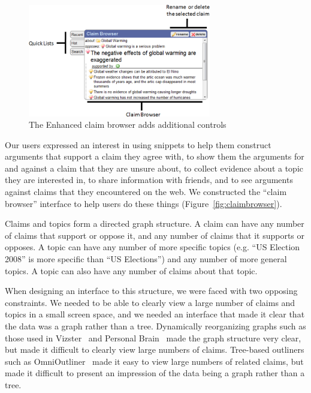 \documentclass{chi2009}
\newcommand{\todo}[1]{}
\begin{document}
\begin{figure}[tb]
	\begin{center}
	\includegraphics[width=8cm]{../screenshots/fullbrowser.png}
	\caption{The Enhanced claim browser adds additional controls}
	\label{enhancedbrowser}
	\end{center}
\end{figure}

Our users expressed an interest in using snippets to help them construct arguments that support a claim they agree with, to show them the arguments for and against a claim that they are unsure about, to collect evidence about a topic they are interested in, to share information with friends, and to see arguments against claims that they encountered on the web. We constructed the ``claim browser'' interface to help users do these things (Figure~\ref{fig:claimbrowser}).

Claims and topics form a directed graph structure. A claim can have any number of claims that support or oppose it, and any number of claims that it supports or opposes.
A topic can have any number of more specific topics (e.g. ``US Election 2008'' is more specific than ``US Elections'') and any number of more general topics. A topic can also have any number of claims about that topic.

When designing an interface to this structure, we were faced with two opposing constraints. We needed to be able to clearly view a large number of claims and topics in a small screen space, and we needed an interface that made it clear that the data was a graph rather than a tree. Dynamically reorganizing graphs such as those used in Vizster~\cite{vizster} and Personal Brain~\cite{thebrain} made the graph structure very clear, but made it difficult to clearly view large numbers of claims. Tree-based outliners such as OmniOutliner~\cite{outliner} made it easy to view large numbers of related claims, but made it difficult to present an impression of the data being a graph rather than a tree.

\todo{This interface is actually closer to TheBrain than the text suggests}
\end{document}
